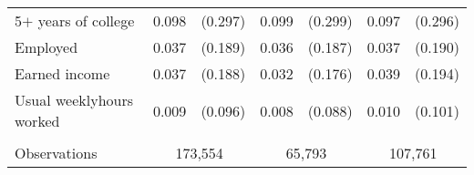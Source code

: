 \begin{tabular}{lcccccc}
 \hspace{0.3cm} 5$+$ years of college  & 0.098 & (0.297)  & 0.099 & (0.299)  & 0.097 & (0.296)  \\
 Employed  & 0.037 & (0.189)  & 0.036 & (0.187)  & 0.037 & (0.190)  \\
 Earned income  & 0.037 & (0.188)  & 0.032 & (0.176)  & 0.039 & (0.194)  \\
 Usual weeklyhours worked  & 0.009 & (0.096)  & 0.008 & (0.088)  & 0.010 & (0.101)  \\
\\
Observations & \multicolumn{2}{c}{173,554} & \multicolumn{2}{c}{65,793} & \multicolumn{2}{c}{107,761} \\
\bottomrule
\bottomrule
\end{tabular}